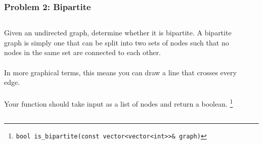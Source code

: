 \documentclass[aspectratio=169]{beamer}
\newcommand{\code}{\texttt}
\begin{document}
\begin{frame}
    \frametitle{Problem 2: Bipartite}
    \begin{columns}
        \begin{column}{0.5\textwidth}
            Given an undirected graph, determine whether it is bipartite.
            A bipartite graph is simply one that can be split into two sets
            of nodes such that no nodes in the same set are connected to each
            other.
            \\~\\
            In more graphical terms, this means you can draw a line that crosses every edge.
            \\~\\
            Your function should take input as a list of nodes and return a
            boolean. \footnote[frame]{\code{bool is\_bipartite(const vector<vector<int>>\& graph)}}
        \end{column}
        \begin{column}{0.5\textwidth}
            \centering
            
        \end{column}
    \end{columns}
\end{frame}
\end{document}
